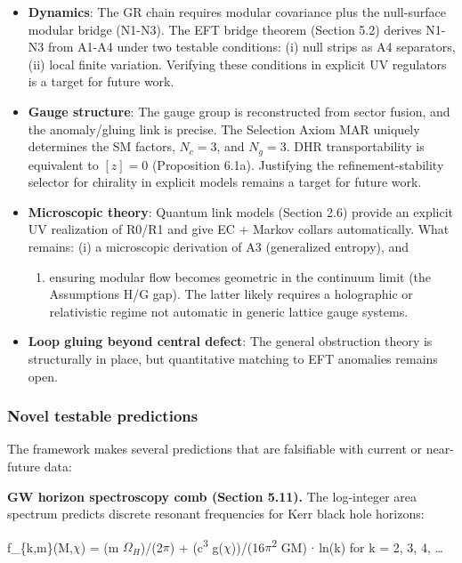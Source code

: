 \documentclass[11pt,a4paper]{article}
\theoremstyle{remark}
\providecommand{\tightlist}{%
  \setlength{\itemsep}{0pt}\setlength{\parskip}{0pt}}
\begin{document}
\begin{itemize}
\tightlist
\item
  \textbf{Dynamics}: The GR chain requires modular covariance plus the null-surface
  modular bridge (N1-N3). The EFT bridge theorem (Section 5.2) derives
  N1-N3 from A1-A4 under two testable conditions: (i) null strips as A4
  separators, (ii) local finite variation. Verifying these conditions in explicit UV regulators is a target for future work.
\item
  \textbf{Gauge structure}: The gauge group is reconstructed from sector fusion,
  and the anomaly/gluing link is precise. The Selection Axiom MAR uniquely
  determines the SM factors, \(N_c = 3\), and \(N_g = 3\). DHR transportability
  is equivalent to \([z]=0\) (Proposition 6.1a). Justifying the
  refinement-stability selector for chirality in explicit models remains
  a target for future work.
\item
  \textbf{Microscopic theory}: Quantum link models (Section 2.6) provide an
  explicit UV realization of R0/R1 and give EC + Markov collars automatically.
  What remains: (i) a microscopic derivation of A3 (generalized entropy), and

  \begin{enumerate}
  \def\labelenumi{(\roman{enumi})}
  \setcounter{enumi}{1}
  \tightlist
  \item
    ensuring modular flow becomes geometric in the continuum limit (the
    Assumptions H/G gap). The latter likely requires a holographic or relativistic
    regime not automatic in generic lattice gauge systems.
  \end{enumerate}
\item
  \textbf{Loop gluing beyond central defect}: The general obstruction theory is
  structurally in place, but quantitative matching to EFT anomalies remains
  open.
\end{itemize}

\subsubsection{Novel testable predictions}\label{novel-testable-predictions}

The framework makes several predictions that are falsifiable with current or
near-future data:

\textbf{GW horizon spectroscopy comb (Section 5.11).} The log-integer area spectrum predicts discrete resonant frequencies for Kerr black hole horizons:

f\_\{k,m\}(M,\ensuremath{\chi}) = (m \(\Omega_H\))/(2\ensuremath{\pi}) + (c\textsuperscript{3} g(\ensuremath{\chi}))/(16\ensuremath{\pi}\textsuperscript{2} GM) \ensuremath{\cdot} ln(k) for k = 2, 3, 4, \ldots{}
\end{document}
